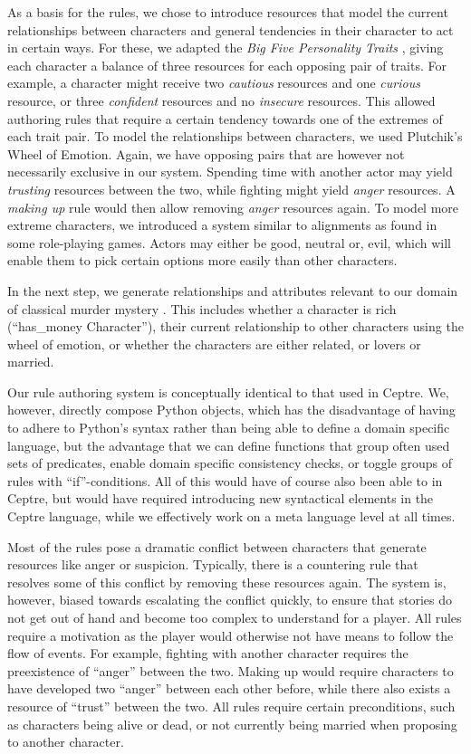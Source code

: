 As a basis for the rules, we chose to introduce resources that model the current relationships between characters and general tendencies in their character to act in certain ways. For these, we adapted the \emph{Big Five Personality Traits} \cite{rothmann_coetzer_2003}, giving each character a balance of three resources for each opposing pair of traits. For example, a character might receive two \emph{cautious} resources and one \emph{curious} resource, or three \emph{confident} resources and no \emph{insecure} resources. This allowed authoring rules that require a certain tendency towards one of the extremes of each trait pair. To model the relationships between characters, we used Plutchik's Wheel of Emotion. Again, we have opposing pairs that are however not necessarily exclusive in our system. Spending time with another actor may yield \emph{trusting} resources between the two, while fighting might yield \emph{anger} resources. A \emph{making up} rule would then allow removing \emph{anger} resources again. To model more extreme characters, we introduced a system similar to alignments as found in some role-playing games. Actors may either be good, neutral or, evil, which will enable them to pick certain options more easily than other characters.

In the next step, we generate relationships and attributes relevant to our domain of classical murder mystery . This includes whether a character is rich (\enquote{has\_money Character}), their current relationship to other characters using the wheel of emotion, or whether the characters are either related, or lovers or married.

Our rule authoring system is conceptually identical to that used in Ceptre. We, however, directly compose Python objects, which has the disadvantage of having to adhere to Python's syntax rather than being able to define a domain specific language, but the advantage that we can define functions that group often used sets of predicates, enable domain specific consistency checks, or toggle groups of rules with \enquote{if}-conditions. All of this would have of course also been able to in Ceptre, but would have required introducing new syntactical elements in the Ceptre language, while we effectively work on a meta language level at all times.

Most of the rules pose a dramatic conflict between characters that generate resources like anger or suspicion.
Typically, there is a countering rule that resolves some of this conflict by removing these resources again.
The system is, however, biased towards escalating the conflict quickly, to ensure that stories do not get out of hand and become too complex to understand for a player. All rules require a motivation as the player would otherwise not have means to follow the flow of events. For example, fighting with another character requires the preexistence of \enquote{anger} between the two. Making up would require characters to have developed two \enquote{anger} between each other before, while there also exists a resource of \enquote{trust} between the two. All rules require certain preconditions, such as characters being alive or dead, or not currently being married when proposing to another character.


